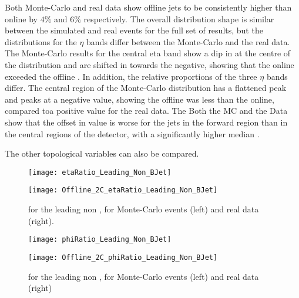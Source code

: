 	Both Monte-Carlo and real data show offline jets to be consistently higher \pt than online by $4\%$ and $6\%$ respectively. The overall distribution shape is similar between the simulated and real events for the full set of results, but the distributions for the $\eta$ bands differ between the Monte-Carlo and the real data. The Monte-Carlo results for the central eta band show a dip in \pt at the centre of the distribution and are shifted in \dptpt towards the negative, showing that the online \pt exceeded the offline \pt. In addition, the relative proportions of the three $\eta$ bands differ. The central region of the Monte-Carlo distribution has a flattened peak and peaks at a negative value, showing the offline \pt was less than the online, compared toa positive value for the real data. The Both the MC and the Data show that the offset in \pt value is worse for the jets in the forward region than in the central regions of the detector, with a significantly higher median \dptpt.

	The other topological variables can also be compared.

	\begin{figure}[h]
		\centering
		\begin{minipage}[h]{0.48\linewidth}
			\texttt{[image: etaRatio\_Leading\_Non\_BJet]}

		\end{minipage}
		\quad
		\begin{minipage}[h]{0.48\linewidth}
			\texttt{[image: Offline\_2C\_etaRatio\_Leading\_Non\_BJet]}
		\end{minipage}
		\caption{\dee for the leading non \bjet, for Monte-Carlo events (left) and real data (right).}
		\label{fig:O:leadingnonbeta}
	\end{figure}

	\begin{figure}[h]
		\centering
		\begin{minipage}[h]{0.48\linewidth}
			\texttt{[image: phiRatio\_Leading\_Non\_BJet]}

		\end{minipage}
		\quad
		\begin{minipage}[h]{0.48\linewidth}
			\texttt{[image: Offline\_2C\_phiRatio\_Leading\_Non\_BJet]}
		\end{minipage}
		\caption{\dphph for the leading non \bjet, for Monte-Carlo events (left) and real data (right)}
		\label{fig:O:leadingnonbphi}
	\end{figure}

